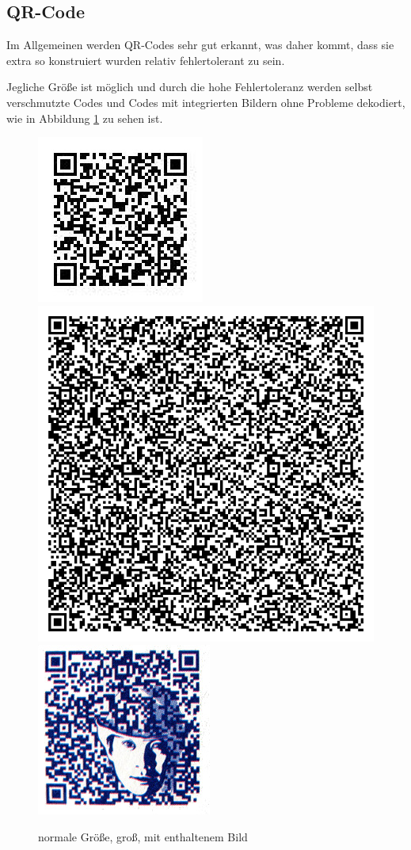 \subsection*{QR-Code}
\writtenby{\dcauthornameriren}%
Im Allgemeinen werden QR-Codes sehr gut erkannt, was daher kommt, dass sie extra so konstruiert wurden relativ fehlertolerant zu sein.

Jegliche Größe ist möglich und durch die hohe Fehlertoleranz werden selbst verschmutzte Codes und Codes mit integrierten Bildern ohne Probleme dekodiert, wie in Abbildung \ref{fig:qrnormal} zu sehen ist.

\begin{figure}[H]
  \centering
  \includegraphics[height=0.3\textwidth]{img/QR/perfect_03.jpg}
  \includegraphics[height=0.3\textwidth]{img/QR/perfect_02.png}
  \includegraphics[height=0.3\textwidth]{img/QR/perfect_04.jpg}
  \caption{normale Größe, groß, mit enthaltenem Bild}
  \label{fig:qrnormal}
\end{figure}

